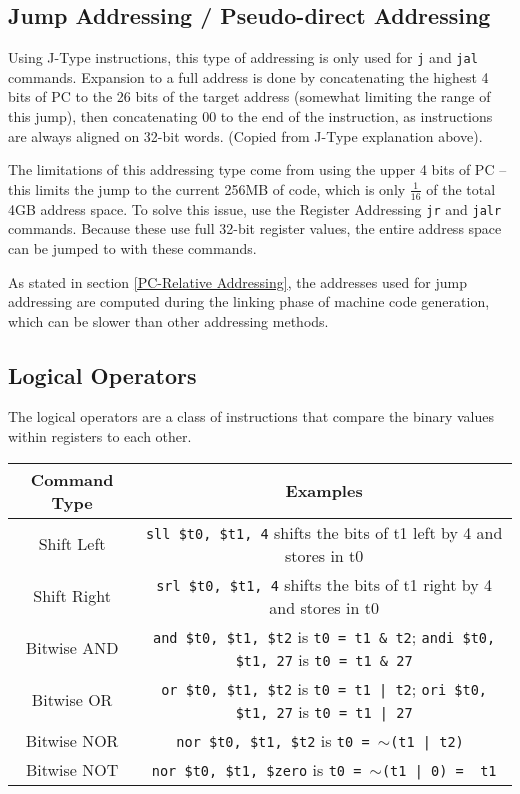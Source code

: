\documentclass{article}
\begin{document}
\subsection{Jump Addressing / Pseudo-direct Addressing}\label{Jump Addressing}

Using J-Type instructions, this type of addressing is only used for \texttt{j} and \texttt{jal} commands. Expansion to a full address is done by concatenating the highest 4 bits of PC to the 26 bits of the target address (somewhat limiting the range of this jump), then concatenating 00 to the end of the instruction, as instructions are always aligned on 32-bit words. (Copied from J-Type explanation above).

The limitations of this addressing type come from using the upper 4 bits of PC -- this limits the jump to the current 256MB of code, which is only $\frac{1}{16}$ of the total 4GB address space. To solve this issue, use the Register Addressing \texttt{jr} and \texttt{jalr} commands. Because these use full 32-bit register values, the entire address space can be jumped to with these commands. 

As stated in section \ref{PC-Relative Addressing}, the addresses used for jump addressing are computed during the linking phase of machine code generation, which can be slower than other addressing methods. 


\subsection{Logical Operators}

The logical operators are a class of instructions that compare the binary values within registers to each other. 

\begin{tabular}{| c | c |}
    \hline
        Command Type & Examples \\
        \hline
        Shift Left & \texttt{sll \$t0, \$t1, 4} shifts the bits of t1 left by 4 and stores in t0 \\
        \hline
        Shift Right & \texttt{srl \$t0, \$t1, 4} shifts the bits of t1 right by 4 and stores in t0 \\
    \hline
    Bitwise AND & \texttt{and \$t0, \$t1, \$t2} is \texttt{t0 = t1 \& t2}; \texttt{andi \$t0, \$t1, 27} is \texttt{t0 = t1 \& 27}\\
    \hline
    Bitwise OR & \texttt{or \$t0, \$t1, \$t2} is \texttt{t0 = t1 | t2}; \texttt{ori \$t0, \$t1, 27} is \texttt{t0 = t1 | 27} \\
    \hline
    Bitwise NOR  & \texttt{nor \$t0, \$t1, \$t2} is \texttt{t0 = $\sim$(t1 | t2) } \\
    \hline
    Bitwise NOT & \texttt{nor \$t0, \$t1, \$zero} is \texttt{t0 = $\sim$(t1 | 0) = ~t1} \\
    \hline
\end{tabular}
\end{document}
